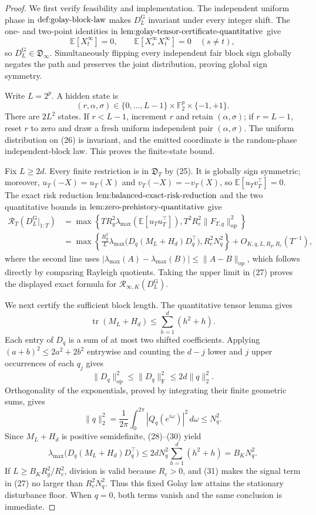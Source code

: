 \documentclass{article}
\begin{document}
\begin{proof}
We first verify feasibility and implementation.  The independent uniform phase in \(\textnormal{def:golay-block-law}\) makes \(D_L^{\mathrm G}\) invariant under every integer shift.  The one- and two-point identities in \(\textnormal{lem:golay-tensor-certificate-quantitative}\) give
\[
\mathbb E[X_t^{\infty}]=0,
\qquad \mathbb E[X_s^{\infty}X_t^{\infty}]=0\quad(s\ne t), \tag{25}
\]
so \(D_L^{\mathrm G}\in\mathfrak D_\infty\).  Simultaneously flipping every independent fair block sign globally negates the path and preserves the joint distribution, proving global sign symmetry.

Write \(L=2^p\).  A hidden state is
\[
(r,\alpha,\sigma)\in\{0,\ldots,L-1\}\times\mathbb F_2^p\times\{-1,+1\}. \tag{26}
\]
There are \(2L^2\) states.  If \(r<L-1\), increment \(r\) and retain \((\alpha,\sigma)\); if \(r=L-1\), reset \(r\) to zero and draw a fresh uniform independent pair \((\alpha,\sigma)\).  The uniform distribution on (26) is invariant, and the emitted coordinate is the random-phase independent-block law.  This proves the finite-state bound.

Fix \(L\ge2d\).  Every finite restriction is in \(\mathfrak D_T\) by (25).  It is globally sign symmetric; moreover, \(u_T(-X)=u_T(X)\) and \(v_T(-X)=-v_T(X)\), so \(\mathbb E[u_Tv_T^{\top}]=0\).  The exact risk reduction \(\textnormal{lem:balanced-exact-risk-reduction}\) and the two quantitative bounds in \(\textnormal{lem:zero-prehistory-quantitative}\) give
\[
\begin{aligned}
\mathcal R_T(D_L^{\mathrm G}|_{1:T})
&=\max\!\left\{T R_g^2\lambda_{\max}(\mathbb E[u_Tu_T^{\top}]),
T^2R_e^2\|F_{T,q}\|_{\mathrm{op}}^2\right\}\\
&=\max\!\left\{
\frac{R_g^2}{L}\lambda_{\max}\!\bigl(D_q(M_L+H_d)D_q^{\top}\bigr),
R_e^2N_q^2\right\}+O_{K,q,L,R_g,R_e}(T^{-1}), \tag{27}
\end{aligned}
\]
where the second line uses \(|\lambda_{\max}(A)-\lambda_{\max}(B)|\le\|A-B\|_{\mathrm{op}}\), which follows directly by comparing Rayleigh quotients.  Taking the upper limit in (27) proves the displayed exact formula for \(\mathcal R_{\infty,K}(D_L^{\mathrm G})\).

We next certify the sufficient block length.  The quantitative tensor lemma gives
\[
\operatorname{tr}(M_L+H_d)\le\sum_{h=1}^d(h^2+h). \tag{28}
\]
Each entry of \(D_q\) is a sum of at most two shifted coefficients.  Applying \((a+b)^2\le2a^2+2b^2\) entrywise and counting the \(d-j\) lower and \(j\) upper occurrences of each \(q_j\) gives
\[
\|D_q\|_{\mathrm{op}}^2\le\|D_q\|_{\mathrm F}^2
\le2d\|q\|_2^2. \tag{29}
\]
Orthogonality of the exponentials, proved by integrating their finite geometric sums, gives
\[
\|q\|_2^2=\frac1{2\pi}\int_0^{2\pi}|Q_q(e^{i\omega})|^2\,d\omega\le N_q^2. \tag{30}
\]
Since \(M_L+H_d\) is positive semidefinite, (28)--(30) yield
\[
\lambda_{\max}\!\bigl(D_q(M_L+H_d)D_q^{\top}\bigr)
\le2dN_q^2\sum_{h=1}^d(h^2+h)=B_KN_q^2. \tag{31}
\]
If \(L\ge B_KR_g^2/R_e^2\), division is valid because \(R_e>0\), and (31) makes the signal term in (27) no larger than \(R_e^2N_q^2\).  Thus this fixed Golay law attains the stationary disturbance floor.  When \(q=0\), both terms vanish and the same conclusion is immediate.


\end{proof}
\end{document}
